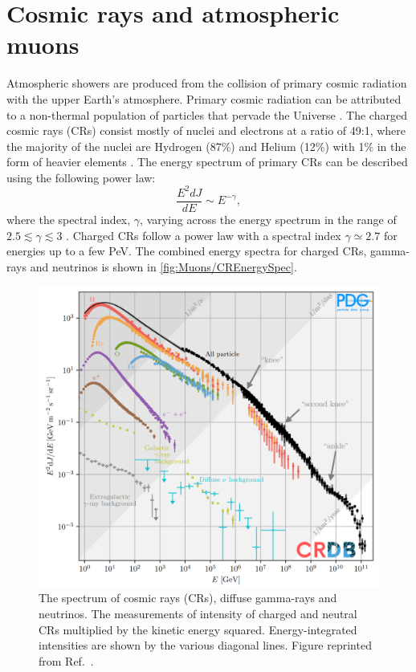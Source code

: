 \section{Cosmic rays and atmospheric muons}\label{sec:Muons/CosmicRays}
Atmospheric showers are produced from the collision of primary cosmic radiation with the upper Earth's atmosphere. Primary cosmic radiation can be attributed to a non-thermal population of particles that pervade the Universe \cite{ParticleDataGroup:2024cfk}. The charged cosmic rays (CRs) consist mostly of nuclei and electrons at a ratio of 49:1, where the majority of the nuclei are Hydrogen (87\%) and Helium (12\%) with 1\% in the form of heavier elements \cite{Longair_2011}. The energy spectrum of primary CRs can be described using the following power law:
\begin{equation}\label{eqn:Muons/CREnergy}
    \frac{E^2dJ}{dE}\sim E^{-\gamma},
\end{equation}
where the spectral index, $\gamma$, varying across the energy spectrum in the range of $2.5\lesssim\gamma\lesssim3$ \cite{ParticleDataGroup:2024cfk}. Charged CRs follow a power law with a spectral index $\gamma\simeq2.7$ for energies up to a few PeV. The combined energy spectra for charged CRs, gamma-rays and neutrinos is shown in \autoref{fig:Muons/CREnergySpec}.
\begin{figure}[h!]
    \centering
    \includegraphics[width=0.7\linewidth]{figures/Muons/CosmicRaySpectra.png}
    \caption[The spectrum of cosmic rays (CRs), diffuse gamma-rays and neutrinos.]{The spectrum of cosmic rays (CRs), diffuse gamma-rays and neutrinos. The measurements of intensity of charged and neutral CRs multiplied by the kinetic energy squared. Energy-integrated intensities are shown by the various diagonal lines. Figure reprinted from Ref.~\cite{ParticleDataGroup:2024cfk}.}
    \label{fig:Muons/CREnergySpec}
\end{figure}
